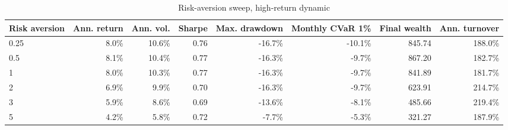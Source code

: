 ﻿\begin{table}[H]
\centering
\caption{Risk-aversion sweep, high-return dynamic}
\label{tab:allocation-risk-aversion-high-return}
\small
\begin{adjustbox}{max width=\linewidth}
\begin{tabular}{lrrrrrrr}
\toprule
Risk aversion & Ann. return & Ann. vol. & Sharpe & Max. drawdown & Monthly CVaR 1\% & Final wealth & Ann. turnover \\
\midrule
0.25 & 8.0\% & 10.6\% & 0.76 & -16.7\% & -10.1\% & 845.74 & 188.0\% \\
0.5 & 8.1\% & 10.4\% & 0.77 & -16.3\% & -9.7\% & 867.20 & 182.7\% \\
1 & 8.0\% & 10.3\% & 0.77 & -16.3\% & -9.7\% & 841.89 & 181.7\% \\
2 & 6.9\% & 9.9\% & 0.70 & -16.3\% & -9.7\% & 623.91 & 214.7\% \\
3 & 5.9\% & 8.6\% & 0.69 & -13.6\% & -8.1\% & 485.66 & 219.4\% \\
5 & 4.2\% & 5.8\% & 0.72 & -7.7\% & -5.3\% & 321.27 & 187.9\% \\
\bottomrule
\end{tabular}
\end{adjustbox}
\end{table}


